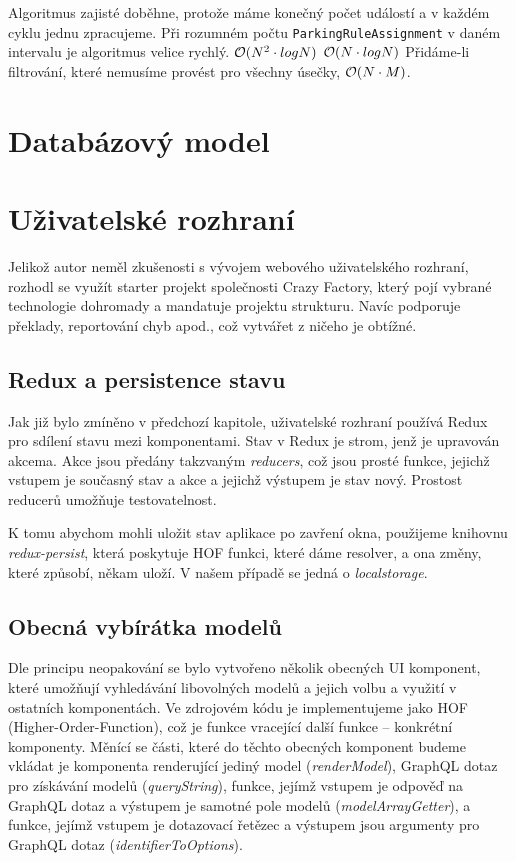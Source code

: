 Algoritmus zajisté doběhne, protože máme konečný počet událostí a v každém cyklu jednu zpracujeme.
Při rozumném počtu \texttt{ParkingRuleAssignment} v daném intervalu je algoritmus velice rychlý.
${\cal O}(N^2\cdot logN)$
${\cal O}(N\cdot logN)$
Přidáme-li filtrování, které nemusíme provést pro všechny úsečky, ${\cal O}(N\cdot M)$.


\section{Databázový model}

\section{Uživatelské rozhraní}

Jelikož autor neměl zkušenosti s vývojem webového uživatelského rozhraní, rozhodl se využít starter projekt
společnosti Crazy Factory, který pojí vybrané technologie dohromady a mandatuje projektu strukturu.
Navíc podporuje překlady, reportování chyb apod., což vytvářet z ničeho je obtížné. \citep[viz][]{CFProj}

\subsection{Redux a persistence stavu}

Jak již bylo zmíněno v předchozí kapitole, uživatelské rozhraní používá Redux pro sdílení stavu mezi komponentami.
Stav v Redux je strom, jenž je upravován akcema. Akce jsou předány takzvaným \textit{reducers}, což jsou prosté funkce,
jejichž vstupem je současný stav a akce a jejichž výstupem je stav nový. \citep[viz][]{ReduxCore}
Prostost reducerů umožňuje testovatelnost.

K tomu abychom mohli uložit stav aplikace po zavření okna, použijeme knihovnu \textit{redux-persist}, která poskytuje
HOF funkci, které dáme resolver, a ona změny, které způsobí, někam uloží. V našem případě se jedná o \textit{localstorage}.

\subsection{Obecná vybírátka modelů}

Dle principu neopakování se bylo vytvořeno několik obecných UI komponent, které umožňují vyhledávání libovolných
modelů a jejich volbu a využití v ostatních komponentách. Ve zdrojovém kódu je implementujeme jako
HOF (Higher-Order-Function), což je funkce vracející další funkce -- konkrétní komponenty.
Měnící se části, které do těchto obecných komponent budeme vkládat je komponenta renderující jediný model
(\textit{renderModel}),
GraphQL dotaz pro získávání modelů (\textit{queryString}), funkce, jejímž vstupem je odpověď na GraphQL dotaz a výstupem je
samotné pole modelů (\textit{modelArrayGetter}), a funkce, jejímž vstupem je dotazovací řetězec a výstupem jsou
argumenty pro GraphQL dotaz (\textit{identifierToOptions}).

